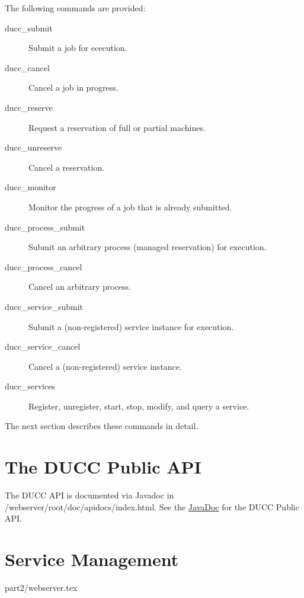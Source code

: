     The following commands are provided:
    \begin{description}
    \item[ducc\_submit] Submit a job for ececution.
    \item[ducc\_cancel] Cancel a job in progress.
    \item[ducc\_reserve] Request a reservation of full or partial machines.
    \item[ducc\_unreserve] Cancel a reservation.
    \item[ducc\_monitor] Monitor the progress of a job that is already submitted.
    \item[ducc\_process\_submit] Submit an arbitrary process (managed reservation) for execution.
    \item[ducc\_process\_cancel] Cancel an arbitrary process.
    \item[ducc\_service\_submit] Submit a (non-registered) service instance for execution.
    \item[ducc\_service\_cancel] Cancel a (non-registered) service instance.
    \item[ducc\_services] Register, unregister, start, stop, modify, and query a service.
    \end{description}
    
    The next section describes these commands in detail.

    
    
    
    
    
    
    
    
    
    
    


\ifpdf
\else
{}
\fi
\chapter{The DUCC Public API}

\label{chap:api}
   \ifpdf
      The DUCC API is documented via Javadoc in \ducchome/webserver/root/doc/apidocs/index.html.
   \else
      See the \href{apidocs/index.html}{JavaDoc} for the DUCC Public API.
   \fi

\ifpdf
\else
{}
\fi
\chapter{Service Management}
\label{chap:services}





 {part2/webserver.tex}

